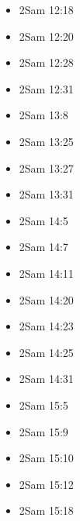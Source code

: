 \documentclass[14pt]{book}
\begin{document}
\begin{multicols}{2}
\begin{itemize}
							\item 2Sam 12:18
							
							\item 2Sam 12:20
							
							\item 2Sam 12:28
							
							\item 2Sam 12:31
							
							\item 2Sam 13:8
							
							\item 2Sam 13:25
							
							\item 2Sam 13:27
							
							\item 2Sam 13:31
							
							\item 2Sam 14:5
							
							\item 2Sam 14:7
							
							\item 2Sam 14:11
							
							\item 2Sam 14:20
							
							\item 2Sam 14:23
							
							\item 2Sam 14:25
							
							\item 2Sam 14:31
							
							\item 2Sam 15:5
							
							\item 2Sam 15:9
							
							\item 2Sam 15:10
							
							\item 2Sam 15:12
							
							\item 2Sam 15:18
							

\end{itemize}
\end{multicols}
\end{document}
